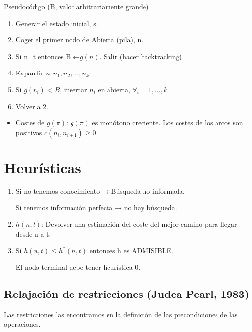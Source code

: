 \documentclass[12pt, twoside, openright]{report} %
\begin{document}
	Pseudocódigo (B, valor arbitrariamente grande)

    \begin{enumerate}
    \def\labelenumi{\arabic{enumi}.}
  
    \item
      Generar el estado inicial, s.
    \item
      Coger el primer nodo de Abierta (pila), n.
    \item
      Si n=t entonces B ←\(g(n)\). Salir (hacer backtracking)
    \item
      Expandir \(n: n_1, n_2, ..., n_k\)
    \item
      Si \(g(n_i)<B\), insertar \(n_i\) en abierta,
      \(\forall _i=1,..., k\)
    \item
      Volver a 2.
    \end{enumerate}

    \begin{itemize}
  
    \item
      Costes de \(g(\pi)\): \(g(\pi)\) es monótono creciente. Los costes
      de los arcos son positivos \(c(n_i,n_{i+1}) \geq 0\).
    \end{itemize}

	
\section{Heurísticas}

  \begin{enumerate}
  \def\labelenumi{\arabic{enumi}.}
  \item
    Si no tenemos conocimiento → Búsqueda no informada.

    Si tenemos información perfecta → no hay búsqueda.
  \item
    \(h(n,t)\): Devolver una estimación del coste del mejor camino para
    llegar desde n a t.
  \item
    Sí \(h(n,t) \leq h^*(n,t)\) entonces h es ADMISIBLE.

    El nodo terminal debe tener heurística 0.
  \end{enumerate}

\subsection{Relajación de restricciones (Judea Pearl, 1983)}



    Las restricciones las encontramos en la definición de las
    precondiciones de las operaciones.
\end{document}

